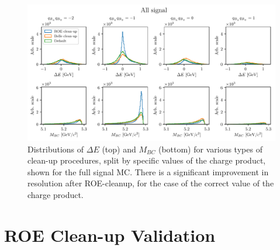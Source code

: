 \begin{figure}[H]
	\centering
	\captionsetup{width=0.8\linewidth}
	\includegraphics[width=\linewidth]{fig/roe_split}
	\caption{Distributions of $\Delta E$ (top) and $M_{BC}$ (bottom) for various types of clean-up procedures, split by specific values of the charge product, shown for the full signal MC. There is a significant improvement in resolution after ROE-cleanup, for the case of the correct value of the charge product.}
	\label{fig:roe_split}
\end{figure}

\section{ROE Clean-up Validation}

